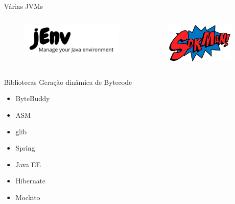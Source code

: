 \documentclass[aspectratio=169]{beamer}
\begin{document}
\begin{frame}[fragile]{Várias JVMs}
\begin{columns}[T] %
    
    \begin{column}[T]{5cm} %
        \begin{figure}
            \centering
            \includegraphics[width=\linewidth]{Images/jenv}
        \end{figure}
    \end{column}
    \begin{column}[T]{6cm} %
        \begin{figure}
            \centering
            \includegraphics[width=\linewidth]{Images/sdkman}
        \end{figure}
    \end{column}
\end{columns}
\end{frame}

\begin{frame}[fragile]{Bibliotecas}
    Geração dinâmica de Bytecode 
    \begin{itemize}
        \item ByteBuddy
        \item ASM
        \item glib
        \item Spring
        \item Java EE
        \item Hibernate
        \item Mockito
    \end{itemize}
\end{frame}
\end{document}
